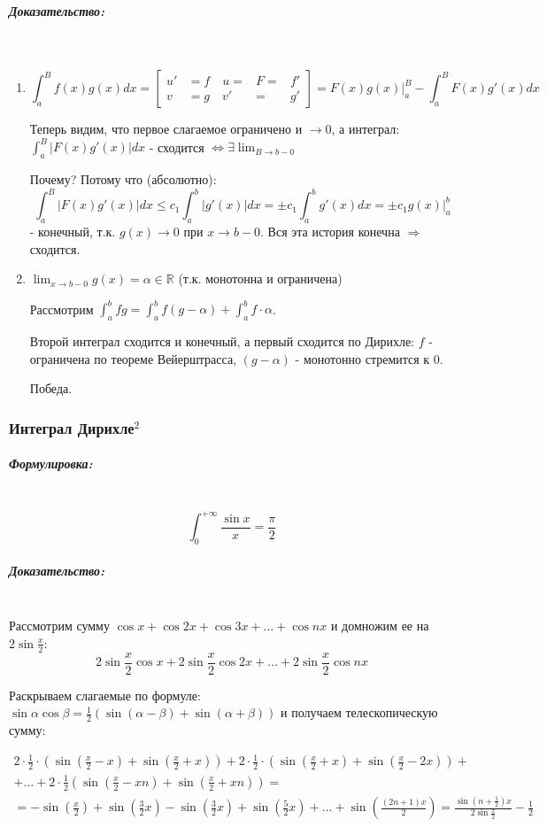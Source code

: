 \documentclass{article}
\let\vanillasubparagraph\subparagraph
\renewcommand{\subparagraph}[1]{\vanillasubparagraph{#1}\mbox{}\\}
\begin{document}
\subparagraph{Доказательство: }
\begin{enumerate}
    \item 

        $$
        \int_a^B f(x) g(x)dx = 
        \left[
            \begin{alignedat}{2}
                u' &= f \quad u = &F = &f'\\
                v &= g \quad v' &= &g'
        \end{alignedat}
        \right]
         = F(x)g(x)|_a^B - \int_a^B F(x)g'(x)dx
        $$

        Теперь видим, что первое слагаемое ограничено и $\to 0$, а интеграл:
        $\int_a^B |F(x)g'(x)|dx$ - сходится $\Leftrightarrow \exists \lim_{B \to b - 0}$ 

        Почему? Потому что (абсолютно): 
        $$
        \int_a^B |F(x)g'(x)|dx \leq c_1 \int_a^b |g'(x)| dx = \pm c_1 \int_a^bg'(x)dx = \pm c_1 g(x)|_a^b
        $$
        - конечный, т.к. $g(x) \to 0$ при $x \to b - 0$. Вся эта история конечна $\Rightarrow$ сходится.
    \item 
        $\lim_{x\to b - 0}g(x) = \alpha \in \mathbb R$ (т.к. монотонна и ограничена)

        Рассмотрим $\int_a^b fg = \int_a^b f(g - \alpha) + \int_a^b f\cdot \alpha$. 

        Второй интеграл сходится и конечный, а первый сходится по Дирихле: $f$ - ограничена по теореме Вейерштрасса, $(g - \alpha)$ - монотонно стремится к $0$.

        Победа.
\end{enumerate}

\subsubsection{Интеграл Дирихле\texorpdfstring{$^2$}{}}

\subparagraph{Формулировка: }
$$
\int_0^{+\infty} \frac{\sin{x}}{x} = \frac{\pi}{2}
$$
\subparagraph{Доказательство: }

Рассмотрим сумму $\cos{x} + \cos{2x} + \cos{3x} + \ldots + \cos{nx}$ и домножим ее на $2\sin{\frac{x}{2}}$: 
$$
2\sin{\frac{x}{2}}\cos{x} + 2\sin{\frac{x}{2}}\cos{2x} + \ldots + 2\sin{\frac{x}{2}}\cos{nx}
$$

Раскрываем слагаемые по формуле: $\sin{\alpha}\cos{\beta} = \frac{1}{2}\left(\sin{(\alpha - \beta)} + \sin{(\alpha + \beta)}\right)$ и получаем телескопическую сумму:

\begin{multline*}
2 \cdot \frac{1}{2} \cdot (\sin{\left(\frac{x}{2} - x\right)} + \sin{\left(\frac{x}{2} + x\right)}) + 2 \cdot \frac{1}{2} \cdot (\sin{\left(\frac{x}{2} + x\right)} + \sin{(\frac{x}{2} - 2x)})+ \\
+ \ldots + 2 \cdot \frac{1}{2} (\sin{\left(\frac{x}{2} - xn\right)} + \sin{\left(\frac{x}{2} + xn\right)})=\\
= -\sin{\left(\frac{x}{2}\right)} + \sin{\left(\frac{3}{2} x\right)} - \sin{\left(\frac{3}{2} x\right)} + \sin{\left(\frac{5}{2} x\right)} + \ldots + \sin{\left(\frac{(2n + 1)x}{2}\right)} = \frac{\sin{(n + \frac{1}{2})x}}{2\sin{\frac{x}{2}}} - \frac{1}{2}
\end{multline*}
\end{document}
